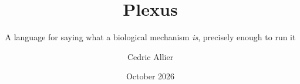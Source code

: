\documentclass[aspectratio=169]{beamer}
\title{\textbf{Plexus}}
\subtitle{A language for saying what a biological mechanism \emph{is}, precisely enough to run it}
\author{Cedric Allier}
\institute{Saalfeld lab, Janelia}
\date{October 2026}
\begin{document}
\frame{\titlepage}


\end{document}
